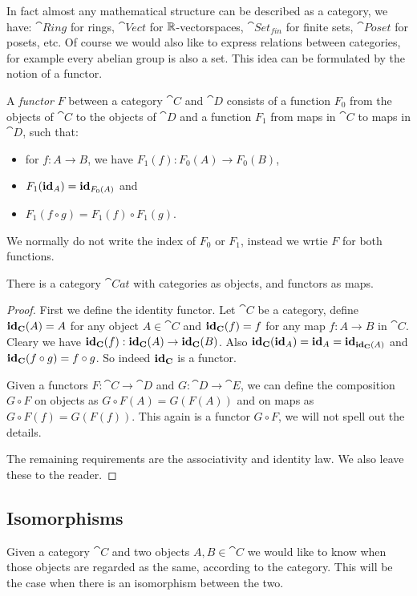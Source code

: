 In fact almost any mathematical structure can be described as a category, we have: $\cat{Ring}$ for rings, $\cat{Vect}$ for $\mathbb{R}$-vectorspaces, $\cat{Set_{fin}}$ for finite sets, $\cat{Poset}$ for posets, etc. Of course we would also like to express relations between categories, for example every abelian group is also a set. This idea can be formulated by the notion of a functor.

\begin{definition}
	A \emph{functor} $F$ between a category $\cat{C}$ and $\cat{D}$ consists of a function $F_0$ from the objects of $\cat{C}$ to the objects of $\cat{D}$ and a function $F_1$ from maps in $\cat{C}$ to maps in $\cat{D}$, such that:
	\begin{itemize}
		\item for $f: A \to B$, we have $F_1(f): F_0(A) \to F_0(B)$,
		\item $F_1(\mathbf{id}_A) = \mathbf{id}_{F_0(A)}$ and
		\item $F_1(f \circ g) = F_1(f) \circ F_1(g)$.
	\end{itemize}
	We normally do not write the index of $F_0$ or $F_1$, instead we wrtie $F$ for both functions.
\end{definition}

\begin{lemma}
	There is a category $\cat{Cat}$ with categories as objects, and functors as maps.
\end{lemma}
\begin{proof}
	First we define the identity functor. Let $\cat{C}$ be a category, define $\mathbf{id}_{\mathbf{C}}(A) = A$ for any object $A \in \cat{C}$ and $\mathbf{id}_{\mathbf{C}}(f) = f$ for any map $f: A \to B$ in $\cat{C}$. Cleary we have $\mathbf{id}_{\mathbf{C}}(f) : \mathbf{id}_{\mathbf{C}}(A) \to \mathbf{id}_{\mathbf{C}}(B)$. Also $\mathbf{id}_{\mathbf{C}}(\mathbf{id}_A) = \mathbf{id}_A = \mathbf{id}_{\mathbf{id}_{\mathbf{C}}(A)}$ and $\mathbf{id}_{\mathbf{C}}(f \circ g) = f \circ g$. So indeed $\mathbf{id}_{\mathbf{C}}$ is a functor.

	Given a functors $F: \cat{C} \to \cat{D}$ and $G: \cat{D} \to \cat{E}$, we can define the composition $G \circ F$ on objects as $G \circ F(A) = G(F(A))$ and on maps as $G \circ F(f) = G(F(f))$. This again is a functor $G \circ F$, we will not spell out the details.

	The remaining requirements are the associativity and identity law. We also leave these to the reader.
\end{proof}

\subsection{Isomorphisms}
Given a category $\cat{C}$ and two objects $A, B \in \cat{C}$ we would like to know when those objects are regarded as the same, according to the category. This will be the case when there is an isomorphism between the two.

